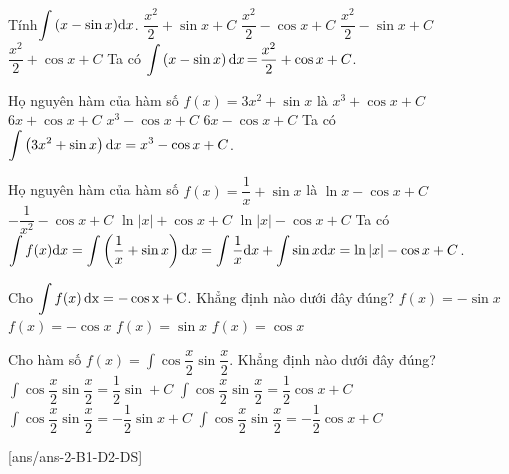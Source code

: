 \begin{ex}%
	Tính$\displaystyle\int{\left(x-\sin x\right)}{\rm{d}}x$.
	\choice
	{$\dfrac{x^2}{2}+\sin x+C$}
	{$\dfrac{x^2}{2}-\cos x+C$}
	{$\dfrac{x^2}{2}-\sin x+C$}
	{\True $\dfrac{x^2}{2}+\cos x+C$}
\loigiai
{
	Ta có $\displaystyle\int{\left(x-\sin x\right){\rm{d}}x\,\rm{=}\,}\dfrac{x^2}{2}+\cos x+C$.}
	\end{ex}
\begin{ex}%
	Họ nguyên hàm của hàm số $f(x)=3x^2+\sin x$ là
	\choice
	{$x^3+\cos x+C$}
	{$6x+\cos x+C$}
	{\True $x^3-\cos x+C$}
	{$6x-\cos x+C$}
	\loigiai
	{
		Ta có $\displaystyle\int\left(3x^2+\sin x\right){\rm{d}}x=x^3-\cos x+C$.}
\end{ex}
\begin{ex}%
	Họ nguyên hàm của hàm số $ f(x)=\dfrac{1}{x}+\sin x$ là
	\choice
	{$\ln x-\cos x+C$}
	{$-\dfrac{1}{x^2}-\cos x+C$}
	{$\ln\left| x\right|+\cos x+C$}
	{\True $\ln\left| x\right|-\cos x+C$}
	\loigiai
	{
		Ta có $\displaystyle\int{f(x){\rm{d}}x}=\displaystyle\int{\left(\dfrac{1}{x}+\sin x\right){\rm{d}}x}=\displaystyle\int{\dfrac{1}{x}{\rm{d}}x}+\displaystyle\int{\sin x{\rm{d}}x}=\ln\left| x\right|-\cos x+C$.}
\end{ex}
\begin{ex}%
	Cho $\displaystyle\int{f(x)}\,\rm{d}x=-\cos x+C$. Khẳng định nào dưới đây đúng?
	\choice
	{$ f(x)=-\sin x$}
	{$ f(x)=-\cos x$}
	{\True $ f(x)=\sin x$}
	{$ f(x)=\cos x$}
\end{ex}
\begin{ex}%
	Cho hàm số $ f(x)=\displaystyle\int{\cos\dfrac{x}{2}\sin\dfrac{x}{2}}$. Khẳng định nào dưới đây đúng?
	\choice
	{$\displaystyle\int{\cos\dfrac{x}{2}\sin\dfrac{x}{2}}=\dfrac{1}{2}\sin+C$}
	{$\displaystyle\int{\cos\dfrac{x}{2}\sin\dfrac{x}{2}}=\dfrac{1}{2}\cos x+C$}
	{$\displaystyle\int{\cos\dfrac{x}{2}\sin\dfrac{x}{2}}=-\dfrac{1}{2}\sin x+C$}
	{\True $\displaystyle\int{\cos\dfrac{x}{2}\sin\dfrac{x}{2}}=-\dfrac{1}{2}\cos x+C$}
\end{ex}
[ans/ans-2-B1-D2-DS]
\TNTF
